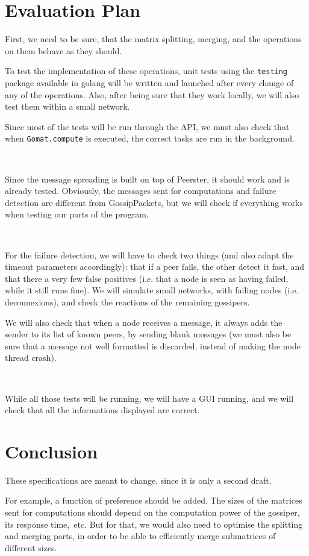 \documentclass[a4paper,12pt]{article}
\begin{document}
    \section{Evaluation Plan}
    First, we need to be sure, that the matrix splitting, merging, and the operations on them behave as they should.

    To test the implementation of these operations, unit tests using the \texttt{testing} package available in golang will be written and launched after every change of any of the operations. Also, after being sure that they work locally, we will also test them within a small network.

    Since most of the tests will be run through the API, we must also check that when \texttt{Gomat.compute} is executed, the correct tasks are run in the background.

~~

    Since the message spreading is built on top of Peerster, it should work and is already tested. Obviously, the messages sent for computations and failure detection are different from GossipPackets, but we will check if everything works when testing our parts of the program.

~~

    For the failure detection, we will have to check two things (and also adapt the timeout parameters accordingly): that if a peer fails, the other detect it fast, and that there a very few false positives (i.e. that a node is seen as having failed, while it still runs fine). We will simulate small networks, with failing nodes (i.e. deconnexions), and check the reactions of the remaining gossipers.

    We will also check that when a node receives a message, it always adds the sender to its list of known peers, by sending blank messages (we must also be sure that a message not well formatted is discarded, instead of making the node thread crash).

~~

    While all those tests will be running, we will have a GUI running, and we will check that all the informations displayed are correct.

    \section{Conclusion}
    These specifications are meant to change, since it is only a second draft.

    For example, a function of preference should be added. The sizes of the matrices sent for computations should depend on the computation power of the gossiper, its response time,~etc. But for that, we would also need to optimise the splitting and merging parts, in order to be able to efficiently merge submatrices of different sizes.
\end{document}
